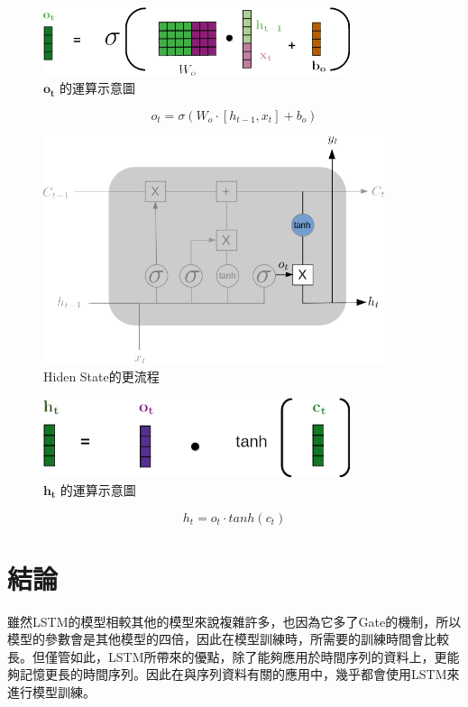 \begin{figure}[H]
	\centering
	\includegraphics[width=9cm]{./pic/bcjXoMZk.png}
	\caption{\(\mathbf{o_t}\) 的運算示意圖}
	\label{fig:OutputGateCalculate}
\end{figure}

\begin{equation}
	\label{eqn:OutputGateCalculate}
	o_t = \sigma(W_o\cdot[h_{t-1},x_t]+b_o)
\end{equation}

\begin{figure}[H]
	\centering
	\includegraphics[width=10cm]{./pic/evwQIqAz.png}
	\caption{Hiden State的更流程}
	\label{fig:HidenStateUpdate}
\end{figure}


\begin{figure}[H]
	\centering
	\includegraphics[width=9cm]{./pic/vo6a2bAS.png}
	\caption{\(\mathbf{h_t}\) 的運算示意圖}
	\label{fig:HidenStateUpdateCaculate}
\end{figure}


\begin{equation}
	\label{eqn:InputCalculate}
	h_t = o_t \cdot tanh(c_t) 
\end{equation}



\section {結論}

雖然LSTM的模型相較其他的模型來說複雜許多，也因為它多了Gate的機制，所以模型的參數會是其他模型的四倍，因此在模型訓練時，所需要的訓練時間會比較長。但僅管如此，LSTM所帶來的優點，除了能夠應用於時間序列的資料上，更能夠記憶更長的時間序列。因此在與序列資料有關的應用中，幾乎都會使用LSTM來進行模型訓練。





